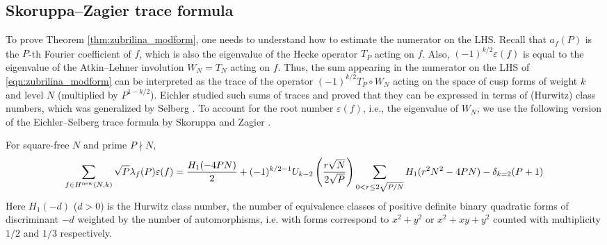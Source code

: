 \subsection{Skoruppa--Zagier trace formula}

To prove Theorem \ref{thm:zubrilina_modform}, one needs to understand how to estimate the numerator on the LHS.
Recall that $a_f(P)$ is the $P$-th Fourier coefficient of $f$, which is also the eigenvalue of the Hecke operator $T_P$ acting on $f$.
Also, $(-1)^{k/2}\varepsilon(f)$ is equal to the eigenvalue of the Atkin--Lehner involution $W_N = T_N$ acting on $f$.
Thus, the sum appearing in the numerator on the LHS of \eqref{eqn:zubrilina_modform} can be interpreted as the trace of the operator $(-1)^{k/2} T_P \circ W_N$ acting on the space of cusp forms of weight $k$ and level $N$ (multiplied by $P^{1 - k/2}$).
Eichler \cite{eichler1955class} studied such sums of traces and proved that they can be expressed in terms of (Hurwitz) class numbers, which was generalized by Selberg \cite{selberg1956harmonic}.
To account for the root number $\varepsilon(f)$, i.e., the eigenvalue of $W_N$, we use the following version of the Eichler--Selberg trace formula by Skoruppa and Zagier \cite{skoruppa1988jacobi}.

\begin{theorem}
    \label{thm:sz_tf}
    For square-free $N$ and prime $P \nmid N$,
    \begin{equation}
        \label{eqn:sz_tf}
        \sum_{f \in H^{\mathrm{new}}(N, k)} \sqrt{P} \lambda_f(P) \varepsilon(f)\nonumber = \frac{H_1(-4PN)}{2} + (-1)^{k/2 - 1} U_{k - 2} \left(\frac{r\sqrt{N}}{2\sqrt{P}}\right) \sum_{0 < r \le 2\sqrt{P/N}} H_1(r^2 N^2 - 4PN) - \delta_{k=2}(P+1)
    \end{equation}
    Here $H_1(-d)$ ($d > 0$) is the Hurwitz class number, the number of equivalence classes of positive definite binary quadratic forms of discriminant $-d$ weighted by the number of automorphisms, i.e. with forms correspond to $x^2 + y^2$ or $x^2 + xy + y^2$ counted with multiplicity $1/2$ and $1/3$ respectively.
\end{theorem}

